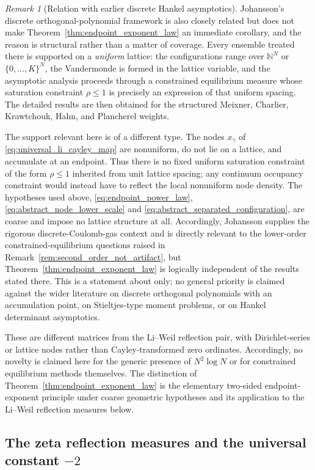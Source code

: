 \documentclass[11pt]{amsart}
\numberwithin{equation}{section}
\theoremstyle{plain}
\theoremstyle{definition}
\theoremstyle{remark}
\newtheorem{remark}[theorem]{Remark}
\begin{document}
\begin{remark}[Relation with earlier discrete Hankel asymptotics]
Johansson's discrete orthogonal-polynomial framework \cite{Johansson2001} is also closely related but does not make Theorem~\ref{thm:endpoint_exponent_law} an immediate corollary, and the reason is structural rather than a matter of coverage.  Every ensemble treated there is supported on a \emph{uniform} lattice: the configurations range over $\mathbb N^N$ or $\{0,\dots,K\}^N$, the Vandermonde is formed in the lattice variable, and the asymptotic analysis proceeds through a constrained equilibrium measure whose saturation constraint $\rho\le1$ is precisely an expression of that uniform spacing.  The detailed results are then obtained for the structured Meixner, Charlier, Krawtchouk, Hahn, and Plancherel weights.

The support relevant here is of a different type.  The nodes $x_\gamma$ of \eqref{eq:universal_li_cayley_map} are nonuniform, do not lie on a lattice, and accumulate at an endpoint.  Thus there is no fixed uniform saturation constraint of the form $\rho\le1$ inherited from unit lattice spacing; any continuum occupancy constraint would instead have to reflect the local nonuniform node density.  The hypotheses used above, \eqref{eq:endpoint_power_law}, \eqref{eq:abstract_node_lower_scale} and \eqref{eq:abstract_separated_configuration}, are coarse and impose no lattice structure at all.  Accordingly, Johansson supplies the rigorous discrete-Coulomb-gas context and is directly relevant to the lower-order constrained-equilibrium questions raised in Remark~\ref{rem:second_order_not_artifact}, but Theorem~\ref{thm:endpoint_exponent_law} is logically independent of the results stated there.  This is a statement about \cite{Johansson2001} only; no general priority is claimed against the wider literature on discrete orthogonal polynomials with an accumulation point, on Stieltjes-type moment problems, or on Hankel determinant asymptotics.

These are different matrices from the Li--Weil reflection pair, with Dirichlet-series or lattice nodes rather than Cayley-transformed zero ordinates. Accordingly, no novelty is claimed here for the generic presence of $N^2\log N$ or for constrained equilibrium methods themselves. The distinction of Theorem~\ref{thm:endpoint_exponent_law} is the elementary two-sided endpoint-exponent principle under coarse geometric hypotheses and its application to the Li--Weil reflection measures below.
\end{remark}

\subsection{\texorpdfstring{The zeta reflection measures and the universal constant $-2$}{The zeta reflection measures and the universal constant -2}}
\end{document}
